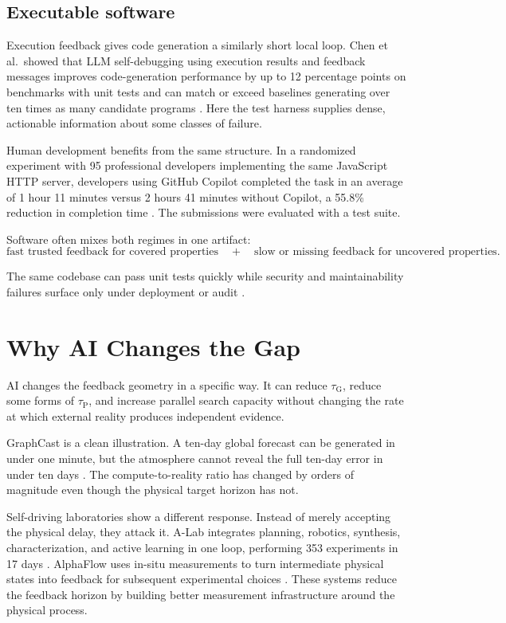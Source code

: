 \documentclass[11pt]{article}
\newcommand{\tauG}{\tau_{\mathrm{G}}}
\newcommand{\tauP}{\tau_{\mathrm{P}}}
\begin{document}
\subsection{Executable software}

Execution feedback gives code generation a similarly short local loop. Chen et al.\ showed that LLM self-debugging using execution results and feedback messages improves code-generation performance by up to 12 percentage points on benchmarks with unit tests and can match or exceed baselines generating over ten times as many candidate programs \parencite{chen2023selfdebug}. Here the test harness supplies dense, actionable information about some classes of failure.

Human development benefits from the same structure. In a randomized experiment with 95 professional developers implementing the same JavaScript HTTP server, developers using GitHub Copilot completed the task in an average of 1 hour 11 minutes versus 2 hours 41 minutes without Copilot, a 55.8\% reduction in completion time \parencite{peng2023copilot}. The submissions were evaluated with a test suite.

Software often mixes both regimes in one artifact:
\[
\text{fast trusted feedback for covered properties}
\quad+\quad
\text{slow or missing feedback for uncovered properties}.
\]

The same codebase can pass unit tests quickly while security and maintainability failures surface only under deployment or audit \parencite{fu2023security}.

\section{Why AI Changes the Gap}

AI changes the feedback geometry in a specific way. It can reduce \(\tauG\), reduce some forms of \(\tauP\), and increase parallel search capacity without changing the rate at which external reality produces independent evidence.

GraphCast is a clean illustration. A ten-day global forecast can be generated in under one minute, but the atmosphere cannot reveal the full ten-day error in under ten days \parencite{lam2023graphcast}. The compute-to-reality ratio has changed by orders of magnitude even though the physical target horizon has not.

Self-driving laboratories show a different response. Instead of merely accepting the physical delay, they attack it. A-Lab integrates planning, robotics, synthesis, characterization, and active learning in one loop, performing 353 experiments in 17 days \parencite{szymanski2023alab}. AlphaFlow uses in-situ measurements to turn intermediate physical states into feedback for subsequent experimental choices \parencite{volk2023alphaflow}. These systems reduce the feedback horizon by building better measurement infrastructure around the physical process.
\end{document}
